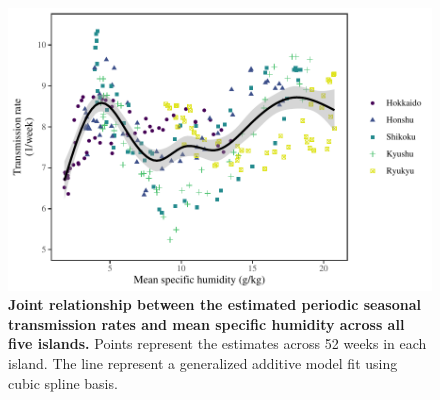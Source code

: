 \documentclass[12pt]{article}
\begin{document}
\pagebreak

\begin{figure}[!th]
\includegraphics[width=\textwidth]{../figure/figure_joint_climate.pdf}
\caption{
\textbf{Joint relationship between the estimated periodic seasonal transmission rates and mean specific humidity across all five islands.}
Points represent the estimates across 52 weeks in each island.
The line represent a generalized additive model fit using cubic spline basis.
}
\end{figure}

\pagebreak
\end{document}
